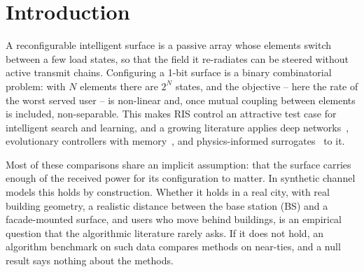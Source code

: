 \documentclass[runningheads]{llncs}
\begin{document}
\section{Introduction}
A reconfigurable intelligent surface is a passive array whose elements switch between a few load states, so that the field it re-radiates can be steered without active transmit chains. Configuring a 1-bit surface is a binary combinatorial problem: with $N$ elements there are $2^N$ states, and the objective -- here the rate of the worst served user -- is non-linear and, once mutual coupling between elements is included, non-separable. This makes RIS control an attractive test case for intelligent search and learning, and a growing literature applies deep networks~\cite{martin2024hardware,xu2022robust,padial2026accelerating,urbinati2026ondevice,peng2025risnet}, evolutionary controllers with memory~\cite{zardi2024memory}, and physics-informed surrogates~\cite{liu2026physics} to it.

Most of these comparisons share an implicit assumption: that the surface carries enough of the received power for its configuration to matter. In synthetic channel models this holds by construction. Whether it holds in a real city, with real building geometry, a realistic distance between the base station (BS) and a facade-mounted surface, and users who move behind buildings, is an empirical question that the algorithmic literature rarely asks. If it does not hold, an algorithm benchmark on such data compares methods on near-ties, and a null result says nothing about the methods.
\end{document}
